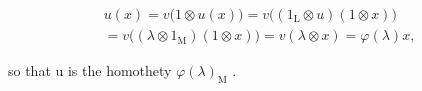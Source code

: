 \[
\begin{array}{c} u (x) = v \bigl (1 \otimes u (x) \bigr) = v \bigl ((1 _ {\mathrm{L}} \otimes u) (1 \otimes x) \bigr) \\ = v \bigl ((\lambda \otimes 1 _ {\mathrm{M}}) (1 \otimes x) \bigr) = v (\lambda \otimes x) = \varphi (\lambda) x, \end{array}
\]

so that u is the homothety \(\varphi(\lambda)_{\mathrm{M}}\) .

